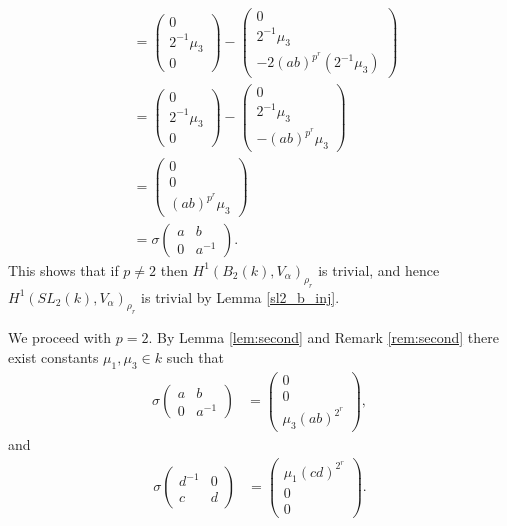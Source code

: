 \begin{align*}
	&=
	\left(\begin{matrix}0\\2^{-1}\mu_3\\0\end{matrix}\right)
	-
	\left(\begin{matrix}0\\2^{-1}\mu_3\\-2(ab)^{p^r} (2^{-1}\mu_3)\end{matrix}\right) \\
	&=\left(\begin{matrix}0\\2^{-1}\mu_3\\0\end{matrix}\right)
	-\left(\begin{matrix}0\\2^{-1}\mu_3\\-(ab)^{p^r}\mu_3\end{matrix}\right) \\
	&=\left(\begin{matrix}0\\0\\(ab)^{p^r}\mu_3\end{matrix}\right) \\
	&= \sigma\left(\begin{matrix}a & b\\0 & a^{-1}\end{matrix}\right).
\end{align*}
This shows that if $p\neq 2$ then $H^1(B_2(k), V_\alpha)_{\rho_r}$ is trivial, and hence $H^1(SL_2(k), V_\alpha)_{\rho_r}$ is trivial by Lemma \ref{sl2_b_inj}.

We proceed with $p=2$.
By Lemma \ref{lem:second} and Remark \ref{rem:second} there exist constants $\mu_1,\mu_3\in k$ such that
	\begin{align*}
	\sigma
			\left(\begin{matrix}a & b \\ 0 & a^{-1}\end{matrix}\right)
	&=
	\left(\begin{matrix}0 \\ 0 \\ \mu_3(ab)^{2^r}\end{matrix}\right),
	\end{align*}
and 
\begin{align*}
	\sigma\left(\begin{matrix}d^{-1} & 0 \\ c & d\end{matrix}\right)
	&=
	\left(\begin{matrix}\mu_1(cd)^{2^r}\\0\\0\end{matrix}\right).
	\end{align*}
	
